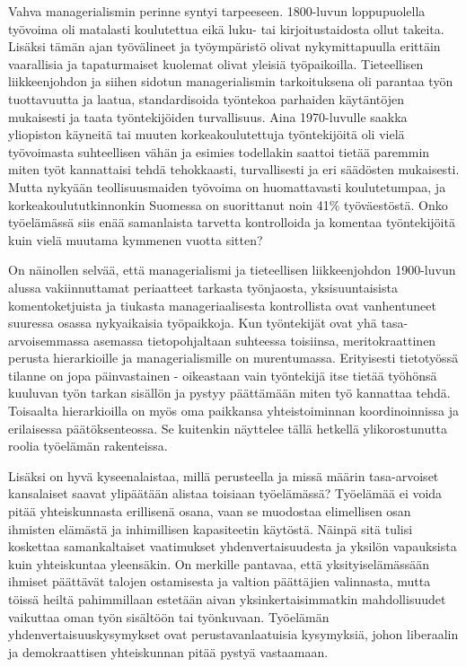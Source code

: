 \documentclass[nobib,finnish,oneside,openany,notoc,a4paper]{tufte-book}
\begin{document}
Vahva managerialismin perinne syntyi tarpeeseen. 1800-luvun
loppupuolella työvoima oli matalasti koulutettua eikä luku- tai
kirjoitustaidosta ollut takeita. Lisäksi tämän ajan työvälineet ja
työympäristö olivat nykymittapuulla erittäin vaarallisia ja
tapaturmaiset kuolemat olivat yleisiä työpaikoilla. Tieteellisen
liikkeenjohdon ja siihen sidotun managerialismin tarkoituksena oli
parantaa työn tuottavuutta ja laatua, standardisoida työntekoa parhaiden
käytäntöjen mukaisesti ja taata työntekijöiden turvallisuus.  Aina
1970-luvulle saakka yliopiston käyneitä tai muuten korkeakoulutettuja
työntekijöitä oli vielä työvoimasta suhteellisen vähän ja esimies
todellakin saattoi tietää paremmin miten työt kannattaisi tehdä
tehokkaasti, turvallisesti ja eri säädösten mukaisesti. Mutta nykyään
teollisuusmaiden työvoima on huomattavasti koulutetumpaa, ja
korkeakoulututkinnonkin Suomessa on suorittanut noin 41\% työväestöstä.
Onko työelämässä siis enää samanlaista tarvetta kontrolloida ja komentaa
työntekijöitä kuin vielä muutama kymmenen vuotta sitten?

On näinollen selvää, että managerialismi ja tieteellisen liikkeenjohdon
1900-luvun alussa vakiinnuttamat periaatteet tarkasta työnjaosta,
yksisuuntaisista komentoketjuista ja tiukasta manageriaalisesta
kontrollista ovat vanhentuneet suuressa osassa nykyaikaisia työpaikkoja.
Kun työntekijät ovat yhä tasa-arvoisemmassa asemassa tietopohjaltaan
suhteessa toisiinsa, meritokraattinen perusta hierarkioille ja
managerialismille on murentumassa. Erityisesti tietotyössä tilanne on
jopa päinvastainen - oikeastaan vain työntekijä itse tietää työhönsä
kuuluvan työn tarkan sisällön ja pystyy päättämään miten työ kannattaa
tehdä. Toisaalta hierarkioilla on myös oma paikkansa yhteistoiminnan
koordinoinnissa ja erilaisessa päätöksenteossa. Se kuitenkin näyttelee
tällä hetkellä ylikorostunutta roolia työelämän rakenteissa.

Lisäksi on hyvä kyseenalaistaa, millä perusteella ja missä määrin
tasa-arvoiset kansalaiset saavat ylipäätään alistaa toisiaan
työelämässä? Työelämää ei voida pitää yhteiskunnasta erillisenä osana,
vaan se muodostaa elimellisen osan ihmisten elämästä ja inhimillisen
kapasiteetin käytöstä. Näinpä sitä tulisi koskettaa samankaltaiset
vaatimukset yhdenvertaisuudesta ja yksilön vapauksista kuin yhteiskuntaa
yleensäkin. On merkille pantavaa, että yksityiselämässään ihmiset
päättävät talojen ostamisesta ja valtion päättäjien valinnasta, mutta
töissä heiltä pahimmillaan estetään aivan yksinkertaisimmatkin
mahdollisuudet vaikuttaa oman työn sisältöön tai työnkuvaan. Työelämän
yhdenvertaisuuskysymykset ovat perustavanlaatuisia kysymyksiä, johon
liberaalin ja demokraattisen yhteiskunnan pitää pystyä vastaamaan.
\end{document}
